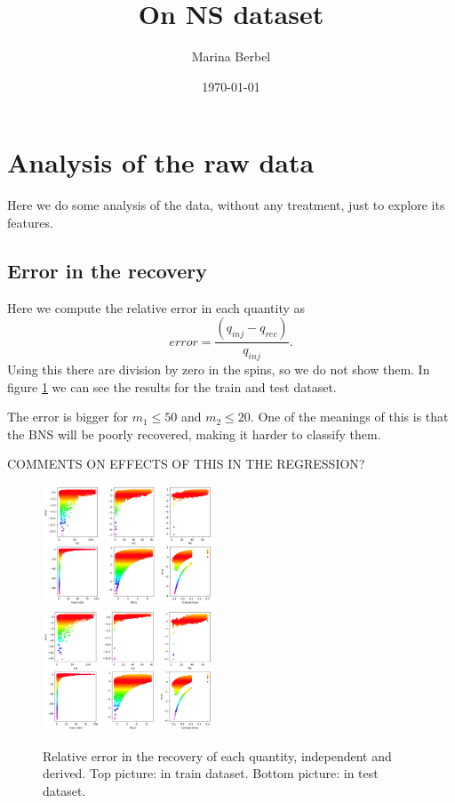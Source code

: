 \documentclass[prd,aps,twocolumn,a4paper,showkeys,nofootinbib]{revtex4-2}
\begin{document}
\title{On NS dataset}

\author{Marina Berbel}

\date{\today}

\maketitle

\section{Analysis of the raw data}
Here we do some analysis of the data, without any treatment, just to explore its features.

\subsection{Error in the recovery}
Here we compute the relative error in each quantity as
\begin{equation}
error=\frac{(q_{inj}-q_{rec})}{q_{inj}}.
\end{equation}
Using this there are division by zero in the spins, so we do not show them.  In figure \ref{fig:relative_erros} we can see the results for the train and test dataset. 

The error is bigger for $m_1\leq50$ and $m_2\leq20$. One of the meanings of this is that the BNS will be poorly recovered, making it harder to classify them.

COMMENTS ON EFFECTS OF THIS IN THE REGRESSION?

\begin{figure}[]
  \center
  \includegraphics[width=0.45\textwidth]{./FigNS/error_in_train}\\
  \includegraphics[width=0.45\textwidth]{./FigNS/error_in_test}
  \caption{\label{fig:relative_erros} Relative error in the recovery of each quantity, independent and derived. Top picture: in train dataset. Bottom picture: in test dataset.}
\end{figure}
\end{document}
